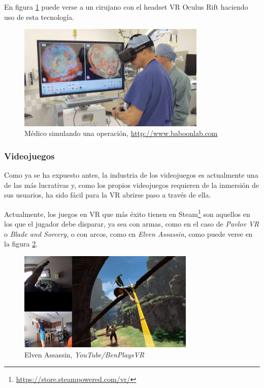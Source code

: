 En figura \ref{fig:medico} puede verse a un cirujano con el headset \acs{VR} Oculus Rift haciendo uso de esta tecnología.

\begin{figure}[!h]
\begin{center}
\includegraphics[width=0.8\textwidth]{imagenes/2/medicina.jpg}
\caption{Médico simulando una operación, \url{http://www.baboonlab.com}}
\label{fig:medico}
\end{center}
\end{figure}
 
\subsubsection{Videojuegos}

Como ya se ha expuesto antes, la industria de los videojuegos es actualmente una de las más lucrativas y, como los propios videojuegos requieren de la inmersión de sus usuarios, ha sido fácil para la \acs{VR} abrirse paso a través de ella.

Actualmente, los juegos en \acs{VR} que más éxito tienen en Steam\footnote{\url{https://store.steampowered.com/vr/}} son aquellos en los que el jugador debe disparar, ya sea con armas, como en el caso de \textit{Pavlov VR} o \textit{Blade and Sorcery}, o con arcos, como en \textit{Elven Assassin}, como puede verse en la figura \ref{fig:elven-assassin}.

\begin{figure}[!h]
\begin{center}
\includegraphics[width=0.75\textwidth]{imagenes/2/elven-assassin.jpg}
\caption{Elven Assassin, \textit{YouTube/BenPlaysVR}}
\label{fig:elven-assassin}
\end{center}
\end{figure}

